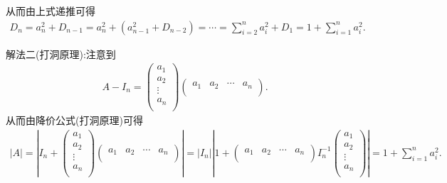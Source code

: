 \documentclass[../../main.tex]{subfiles}
\begin{document}
\begin{solution}
从而由上式递推可得
\begin{align*}
D_n=a_{n}^{2}+D_{n-1}=a_{n}^{2}+\left( a_{n-1}^{2}+D_{n-2} \right) =\cdots =\sum_{i=2}^n{a_{i}^{2}}+D_1=1+\sum_{i=1}^n{a_{i}^{2}}.
\end{align*}

{\color{blue}解法二(打洞原理):}注意到\begin{align*}
A-I_n=\left( \begin{array}{c}
a_1\\
a_2\\
\vdots\\
a_n\\
\end{array} \right) \left( \begin{matrix}
a_1&		a_2&		\cdots&		a_n\\
\end{matrix} \right) .
\end{align*}
从而由降价公式(打洞原理)可得\begin{align*}
\left| A \right|=\left| I_n+\left( \begin{array}{c}
a_1\\
a_2\\
\vdots\\
a_n\\
\end{array} \right) \left( \begin{matrix}
a_1&		a_2&		\cdots&		a_n\\
\end{matrix} \right) \right|=\left| I_n \right|\left| 1+\left( \begin{matrix}
a_1&		a_2&		\cdots&		a_n\\
\end{matrix} \right) I_{n}^{-1}\left( \begin{array}{c}
a_1\\
a_2\\
\vdots\\
a_n\\
\end{array} \right) \right|=1+\sum_{i=1}^n{a_{i}^{2}}.
\end{align*}

\end{solution}
\end{document}

